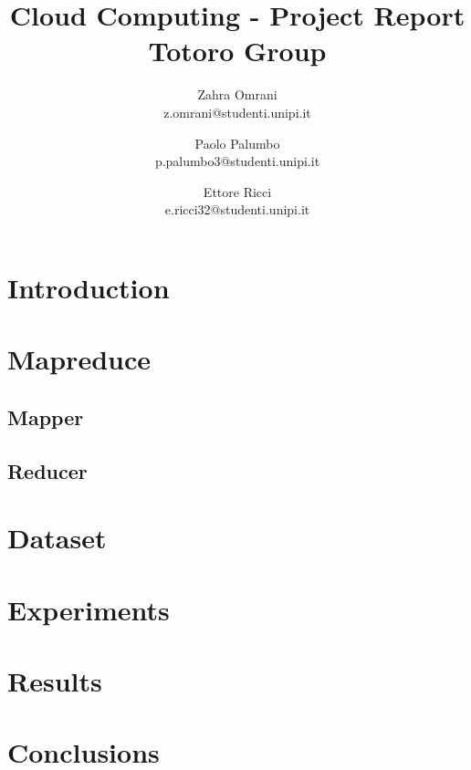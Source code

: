 \documentclass{article}
\title{Cloud Computing - Project Report \\ \small{Totoro Group}}
\author{
    Zahra Omrani \\ z.omrani@studenti.unipi.it \and 
    Paolo Palumbo \\ p.palumbo3@studenti.unipi.it \and
    Ettore Ricci \\ e.ricci32@studenti.unipi.it}
\begin{document}
\maketitle
\begin{abstract}
    
\end{abstract}
\begin{multicols}{2}
\section{Introduction}
\section{Mapreduce}
\subsection{Mapper}
\subsection{Reducer}
\section{Dataset}
\section{Experiments}
\section{Results}
\section{Conclusions}
\end{multicols}
\end{document}
